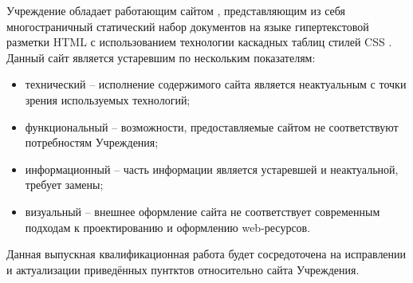 Учреждение обладает работающим сайтом \cite{uc-meson}, представляющим из себя многостраничный статический набор документов на языке гипертекстовой разметки HTML \cite{wiki-html} с использованием технологии каскадных таблиц стилей CSS \cite{wiki-css}. 
Данный сайт является устаревшим по нескольким показателям:
\begin{itemize}
    \item технический -- исполнение содержимого сайта является неактуальным с точки зрения используемых технологий;
    \item функциональный -- возможности, предоставляемые сайтом не соответствуют потребностям Учреждения;
    \item информационный -- часть информации является устаревшей и неактуальной, требует замены;
    \item визуальный -- внешнее оформление сайта не соответствует современным подходам к проектированию и оформлению web-ресурсов.
\end{itemize}

Данная выпускная квалификационная работа будет сосредоточена на исправлении и актуализации приведённых пунтктов относительно сайта Учреждения.

\clearpage
